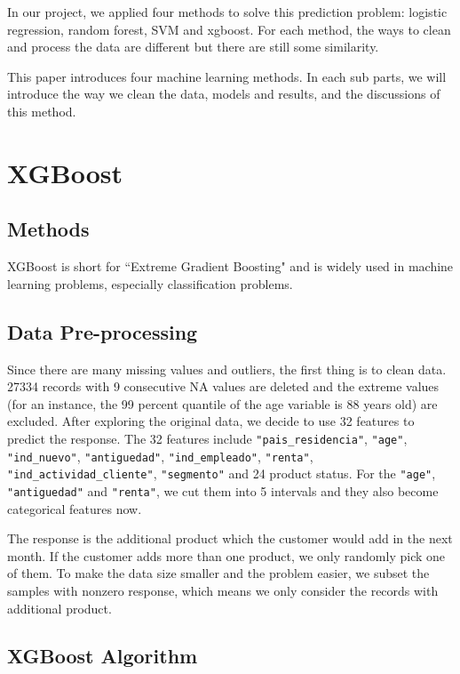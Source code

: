 \documentclass{article}
\begin{document}
\begin{spacing}{1}
\begin{large}
In our project, we applied four methods to solve this prediction problem: logistic regression, random forest, SVM and xgboost. For each method, the ways to clean and process the data are different but there are still some similarity.

This paper introduces four machine learning methods. In each sub parts, we will introduce the way we clean the data, models and results, and the discussions of this method.

\section{XGBoost}

\subsection{Methods}

\noindent \indent XGBoost is short for ``Extreme Gradient Boosting" and is widely used in machine learning problems, especially classification problems\cite{xg1}\cite{xg2}. 

\subsection{Data Pre-processing}

\noindent \indent Since there are many missing values and outliers, the first thing is to clean data. 27334 records with 9 consecutive NA values are deleted and the extreme values (for an instance, the 99 percent quantile of the age variable is 88 years old) are excluded. After exploring the original data, we decide to use 32 features to predict the response. The 32 features include \verb|"pais_residencia"|, \verb|"age"|, \verb|"ind_nuevo"|, \verb|"antiguedad"|, \verb|"ind_empleado"|, \verb|"renta"|, \verb|"ind_actividad_cliente"|, \verb|"segmento"| and 24 product status. For the \verb|"age"|, \verb|"antiguedad"| and \verb|"renta"|, we cut them into 5 intervals and they also become categorical features now. 

The response is the additional product which the customer would add in the next month. If the customer adds more than one product, we only randomly pick one of them. To make the data size smaller and the problem easier, we subset the samples with nonzero response, which means we only consider the records with additional product.

\subsection{XGBoost Algorithm}


\end{large}
\end{spacing}
\end{document}
